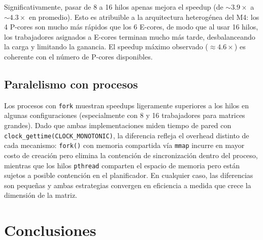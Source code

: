 \documentclass{article}
\begin{document}
Significativamente, pasar de 8 a 16 hilos apenas mejora el speedup (de $\sim 3.9\times$ a $\sim 4.3\times$ en promedio). Esto es atribuible a la arquitectura heterogénea del M4: los 4 P-cores son mucho más rápidos que los 6 E-cores, de modo que al usar 16 hilos, los trabajadores asignados a E-cores terminan mucho más tarde, desbalanceando la carga y limitando la ganancia. El speedup máximo observado ($\approx 4.6\times$) es coherente con el número de P-cores disponibles.

\subsection{Paralelismo con procesos}

Los procesos con \texttt{fork} muestran speedups ligeramente superiores a los hilos en algunas configuraciones (especialmente con 8 y 16 trabajadores para matrices grandes). Dado que ambas implementaciones miden tiempo de pared con \texttt{clock\_gettime(CLOCK\_MONOTONIC)}, la diferencia refleja el overhead distinto de cada mecanismo: \texttt{fork()} con memoria compartida vía \texttt{mmap} incurre en mayor costo de creación pero elimina la contención de sincronización dentro del proceso, mientras que los hilos \texttt{pthread} comparten el espacio de memoria pero están sujetos a posible contención en el planificador. En cualquier caso, las diferencias son pequeñas y ambas estrategias convergen en eficiencia a medida que crece la dimensión de la matriz.

\section{Conclusiones}
\end{document}
